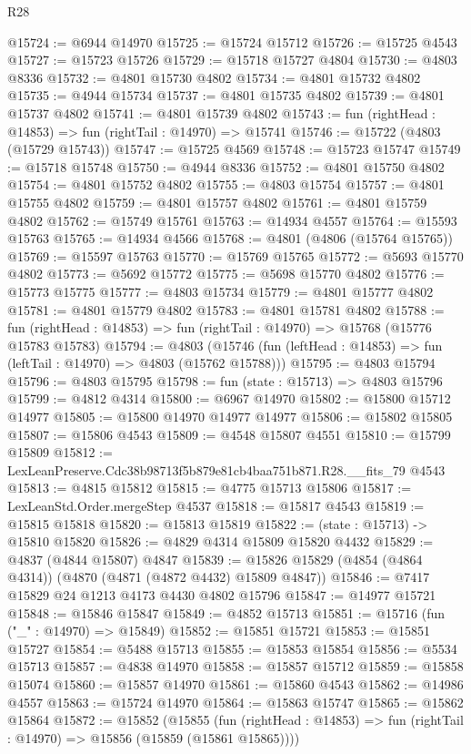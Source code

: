 \begin{lexlean}{R28}
\begin{coremodule}
@15724 := @6944 @14970
@15725 := @15724 @15712
@15726 := @15725 @4543
@15727 := @15723 @15726
@15729 := @15718 @15727 @4804
@15730 := @4803 @8336
@15732 := @4801 @15730 @4802
@15734 := @4801 @15732 @4802
@15735 := @4944 @15734
@15737 := @4801 @15735 @4802
@15739 := @4801 @15737 @4802
@15741 := @4801 @15739 @4802
@15743 := fun (rightHead : @14853) => fun (rightTail : @14970) => @15741
@15746 := @15722 (@4803 (@15729 @15743))
@15747 := @15725 @4569
@15748 := @15723 @15747
@15749 := @15718 @15748
@15750 := @4944 @8336
@15752 := @4801 @15750 @4802
@15754 := @4801 @15752 @4802
@15755 := @4803 @15754
@15757 := @4801 @15755 @4802
@15759 := @4801 @15757 @4802
@15761 := @4801 @15759 @4802
@15762 := @15749 @15761
@15763 := @14934 @4557
@15764 := @15593 @15763
@15765 := @14934 @4566
@15768 := @4801 (@4806 (@15764 @15765))
@15769 := @15597 @15763
@15770 := @15769 @15765
@15772 := @5693 @15770 @4802
@15773 := @5692 @15772
@15775 := @5698 @15770 @4802
@15776 := @15773 @15775
@15777 := @4803 @15734
@15779 := @4801 @15777 @4802
@15781 := @4801 @15779 @4802
@15783 := @4801 @15781 @4802
@15788 := fun (rightHead : @14853) => fun (rightTail : @14970) => @15768 (@15776 @15783 @15783)
@15794 := @4803
    (@15746 (fun (leftHead : @14853) => fun (leftTail : @14970) => @4803 (@15762 @15788)))
@15795 := @4803 @15794
@15796 := @4803 @15795
@15798 := fun (state : @15713) => @4803 @15796
@15799 := @4812 @4314
@15800 := @6967 @14970
@15802 := @15800 @15712 @14977
@15805 := @15800 @14970 @14977 @14977
@15806 := @15802 @15805
@15807 := @15806 @4543
@15809 := @4548 @15807 @4551
@15810 := @15799 @15809
@15812 := LexLeanPreserve.Cdc38b98713f5b879e81cb4baa751b871.R28.__fits_79 @4543
@15813 := @4815 @15812
@15815 := @4775 @15713 @15806
@15817 := LexLeanStd.Order.mergeStep @4537
@15818 := @15817 @4543
@15819 := @15815 @15818
@15820 := @15813 @15819
@15822 := (state : @15713) -> @15810 @15820
@15826 := @4829 @4314 @15809 @15820 @4432
@15829 := @4837 (@4844 @15807) @4847
@15839 := @15826 @15829 (@4854 (@4864 @4314)) (@4870 (@4871 (@4872 @4432) @15809 @4847))
@15846 := @7417 @15829 @24 @1213 @4173 @4430 @4802 @15796
@15847 := @14977 @15721
@15848 := @15846 @15847
@15849 := @4852 @15713
@15851 := @15716 (fun ("_" : @14970) => @15849)
@15852 := @15851 @15721
@15853 := @15851 @15727
@15854 := @5488 @15713
@15855 := @15853 @15854
@15856 := @5534 @15713
@15857 := @4838 @14970
@15858 := @15857 @15712
@15859 := @15858 @15074
@15860 := @15857 @14970
@15861 := @15860 @4543
@15862 := @14986 @4557
@15863 := @15724 @14970
@15864 := @15863 @15747
@15865 := @15862 @15864
@15872 := @15852
    (@15855
      (fun (rightHead : @14853) => fun (rightTail : @14970) => @15856 (@15859 (@15861 @15865))))

\end{coremodule}
\end{lexlean}
